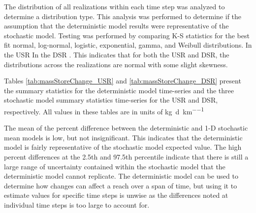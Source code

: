 \begin{linenumbers}
The distribution of all realizations within each time step was analyzed to determine a distribution type.  This analysis was performed to determine if the assumption that the deterministic model results were representative of the stochastic model.  Testing was performed by comparing K-S statistics for the best fit normal, log-normal, logistic, exponential, gamma, and Weibull distributions.  In the USR   In the DSR .  This indicates that for both the USR and DSR, the distributions across the realizations are normal with some slight skewness. 

Tables \ref{tab:massStoreChange_USR} and \ref{tab:massStoreChange_DSR} present the summary statistics for the deterministic model time-series and the three stochastic model summary statistics time-series for the USR and DSR, respectively.  All values in these tables are in units of \si{\kilo\gram\per\day\per\kilo\meter}

\subtabletop
\begin{table}[htbp]
	\centering
	\caption[USR river reach deterministic and stochastic dissolved selenium mass storage change time series summary statistics.]{USR river reach deterministic and stochastic dissolved selenium mass storage change time series summary statistics.  Values are in units of \si{\kilo\gram\per\day\per\kilo\meter}.}
	\label{tab:massStoreChange_USR}
	
\end{table}
\tablevspace
\subtabletop
\begin{table}[htbp]
	\centering
	\caption[DSR river reach deterministic and stochastic dissolved selenium mass storage change time series summary statistics.]{DSR river reach deterministic and stochastic dissolved selenium mass storage change time series summary statistics.  Values are in units of \si{\kilo\gram\per\day\per\kilo\meter}.}
	\label{tab:massStoreChange_DSR}
	
\end{table}

The mean of the percent difference between the deterministic and 1-D stochastic mean models is low, but not insignificant.  This indicates that the deterministic model is fairly representative of the stochastic model expected value.  The high percent differences at the 2.5th and 97.5th percentile indicate that there is still a large range of uncertainty contained within the stochastic model that the deterministic model cannot replicate.  The deterministic model can be used to determine how changes can affect a reach over a span of time, but using it to estimate values for specific time steps is unwise as the differences noted at individual time steps is too large to account for.



\end{linenumbers}
